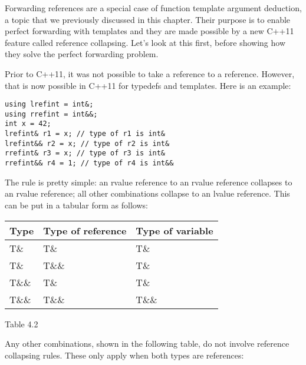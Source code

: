 Forwarding references are a special case of function template argument deduction, a topic that we previously discussed in this chapter. Their purpose is to enable perfect forwarding with templates and they are made possible by a new C++11 feature called reference collapsing. Let’s look at this first, before showing how they solve the perfect forwarding problem.

Prior to C++11, it was not possible to take a reference to a reference. However, that is now possible in C++11 for typedefs and templates. Here is an example:

\begin{lstlisting}[style=styleCXX]
using lrefint = int&;
using rrefint = int&&;
int x = 42;
lrefint& r1 = x; // type of r1 is int&
lrefint&& r2 = x; // type of r2 is int&
rrefint& r3 = x; // type of r3 is int&
rrefint&& r4 = 1; // type of r4 is int&&
\end{lstlisting}

The rule is pretty simple: an rvalue reference to an rvalue reference collapses to an rvalue reference; all other combinations collapse to an lvalue reference. This can be put in a tabular form as follows:

\begin{table}[H]
\centering
	\begin{tabular}{|l|l|l|}
		\hline
		\textbf{Type} & \textbf{Type of reference} & \textbf{Type of variable} \\ \hline
		T\&           & T\&                        & T\&                       \\ \hline
		T\&           & T\&\&                      & T\&                       \\ \hline
		T\&\&         & T\&                        & T\&                       \\ \hline
		T\&\&         & T\&\&                      & T\&\&                     \\ \hline
	\end{tabular}
\end{table}

\begin{center}
Table 4.2
\end{center}

Any other combinations, shown in the following table, do not involve reference collapsing rules. These only apply when both types are references:

